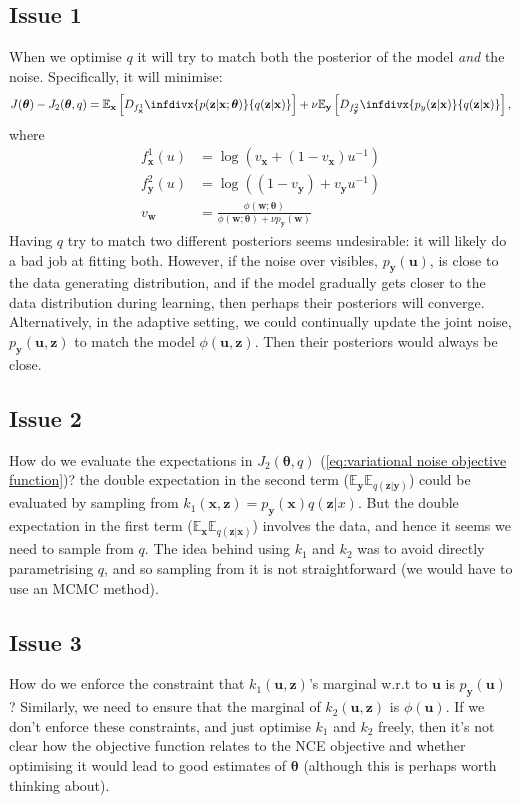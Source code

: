 \documentclass[11pt, oneside]{article}
\newcommand{\thetab}{{\boldsymbol{\theta}}}
\newcommand{\pnn}{\phi}
\newcommand{\pnoise}{p_{ \mathbf y}}
\renewcommand{\u}{{\mathbf u}}
\newcommand{\x}{{\mathbf x}}
\newcommand{\y}{{\mathbf y}}
\newcommand{\z}{{\mathbf z}}
\newcommand{\w}{{\mathbf w}}
\newcommand{\E}{\mathbb{E}}
\newcommand{\Ex}{\E_{\x}}
\newcommand{\Ey}{\E_{\y}}
\theoremstyle{definition}
\newcommand{\infdiv}[1]{D_{#1}\infdivx}
\begin{document}
{\subsection*{Issue 1}
When we optimise $q$ it will try to match both the posterior of the model \emph{and} the noise. Specifically, it will minimise:
\begin{equation}
        J(\thetab) - J_2(\thetab, q) = \Ex \left[ \infdiv{f^1_{\x}}{p(\z | \x; \thetab)}{q(\z | \x)} \right] + \nu  \Ey \left[ \infdiv{f^2_{\y}}{p_y(\z | \x)}{q(\z | \x)} \right],
    \end{equation}
where
\begin{align}
    f^1_{\x}(u) &= \log(v_{\x} + (1 - v_{\x})u^{-1}) \\
    f^2_{\y}(u) &= \log((1 - v_{\y}) + v_{\y}u^{-1}) \\
    v_{\w} &= \frac{\pnn(\textbf{w}; \thetab)}{\pnn(\textbf{w}; \thetab) + \nu \pnoise(\textbf{w})}
\end{align}
Having $q$ try to match two different posteriors seems undesirable: it will likely do a bad job at fitting both. However, if the noise over visibles, $\pnoise(\u)$, is close to the data generating distribution, and if the model gradually gets closer to the data distribution during learning, then perhaps their posteriors will converge. Alternatively, in the adaptive setting, we could continually update the joint noise, $\pnoise(\u, \z)$ to match the model $\pnn(\u, \z)$. Then their posteriors would always be close. 

\subsection*{Issue 2}
How do we evaluate the expectations in $J_2(\thetab, q)$ (\ref{eq:variational noise objective function})? the double expectation in the second term ($\Ey \mathbb{E}_{q(\z | \y)}$) could be evaluated by sampling from $k_1(\x, \z) = \pnoise(\x) q(\z |x)$. But the double expectation in the first term ($\Ex \mathbb{E}_{q(\z | \x)}$) involves the data, and hence it seems we need to sample from $q$. The idea behind using $k_1$ and $k_2$ was to avoid directly parametrising $q$, and so sampling from it is not straightforward (we would have to use an MCMC method).

\subsection*{Issue 3}
How do we enforce the constraint that $k_1(\u, \z)$'s marginal w.r.t to $\u$ is $\pnoise(\u)$? Similarly, we need to ensure that the marginal of $k_2(\u, \z)$ is $\pnn(\u)$. If we don't enforce these constraints, and just optimise $k_1$ and $k_2$ freely, then it's not clear how the objective function relates to the NCE objective and whether optimising it would lead to good estimates of $\thetab$ (although this is perhaps worth thinking about).

}
\end{document}
